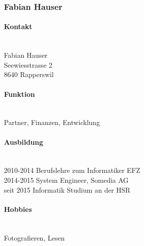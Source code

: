 \subsubsection{Fabian Hauser}
\noindent\begin{minipage}{0.7\textwidth}
	\paragraph{Kontakt} \hfill \\
	Fabian Hauser \\
	Seewiesstrasse 2 \\
	8640 Rapperswil \\
	
	\paragraph{Funktion} \hfill \\
	Partner, Finanzen, Entwicklung \\
	
	\paragraph{Ausbildung} \hfill \\
	2010-2014 \hspace{1cm} Berufslehre zum Informatiker EFZ \\
	2014-2015 \hspace{1cm} System Engineer, Somedia AG \\
	seit 2015 \hspace{1.25cm} Informatik Studium an der HSR \\
	
	\paragraph{Hobbies} \hfill \\
	Fotografieren, Lesen \\
\end{minipage}
\hfill
